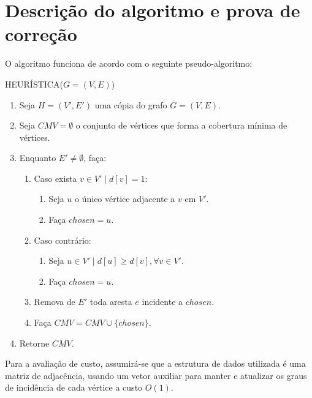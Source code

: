 \section{Descrição do algoritmo e prova de correção}
\label{sec:descricao-algoritmo}

O algoritmo funciona de acordo com o seguinte pseudo-algoritmo:

HEURÍSTICA($G = (V, E)$)
\begin{enumerate}
    \item Seja $H = (V', E')$ uma cópia do grafo $G= (V, E)$.
    \item Seja $CMV = \emptyset$ o conjunto de vértices que forma a
    cobertura mínima de vértices.
    \item Enquanto $E' \ne \emptyset$, faça:
    \label{item:loop}

    \begin{enumerate}
        \item Caso exista $v \in V' \mid d[v] = 1$:
        \label{item:alone}

        \begin{enumerate}
            \item Seja $u$ o único vértice adjacente a $v$ em $V'$.
            \label{item:find}

            \item Faça $chosen = u$.
        \end{enumerate}
        \item Caso contrário:
        \begin{enumerate}
            \item Seja $u \in V' \mid d[u] \ge d[v], \forall v \in
            V'$.
            \label{item:max}

            \item Faça $chosen = u$.
        \end{enumerate}
        \item Remova de $E'$ toda aresta $e$ incidente a $chosen$.
        \label{item:remove}

        \item Faça $CMV = CMV \cup \{chosen\}$.
    \end{enumerate}
    \item Retorne $CMV$.
\end{enumerate}

Para a avaliação de custo, assumirá-se que a estrutura de dados
utilizada é uma matriz de adjacência, usando um vetor auxiliar para
manter e atualizar os graus de incidência de cada vértice a custo
$O(1)$.

